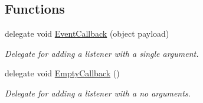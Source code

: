 \subsection*{Functions}
\begin{DoxyCompactItemize}
\item 
\hypertarget{namespacestrange_1_1extensions_1_1dispatcher_1_1eventdispatcher_1_1api_a5b2a372c9c074884178eb4a32992afd3}{delegate void \hyperlink{namespacestrange_1_1extensions_1_1dispatcher_1_1eventdispatcher_1_1api_a5b2a372c9c074884178eb4a32992afd3}{Event\-Callback} (object payload)}\label{namespacestrange_1_1extensions_1_1dispatcher_1_1eventdispatcher_1_1api_a5b2a372c9c074884178eb4a32992afd3}

\begin{DoxyCompactList}\small\item\em Delegate for adding a listener with a single argument. \end{DoxyCompactList}\item 
\hypertarget{namespacestrange_1_1extensions_1_1dispatcher_1_1eventdispatcher_1_1api_a4d68e68b31e6e0f733bd72ddcd6111fa}{delegate void \hyperlink{namespacestrange_1_1extensions_1_1dispatcher_1_1eventdispatcher_1_1api_a4d68e68b31e6e0f733bd72ddcd6111fa}{Empty\-Callback} ()}\label{namespacestrange_1_1extensions_1_1dispatcher_1_1eventdispatcher_1_1api_a4d68e68b31e6e0f733bd72ddcd6111fa}

\begin{DoxyCompactList}\small\item\em Delegate for adding a listener with a no arguments. \end{DoxyCompactList}\end{DoxyCompactItemize}


